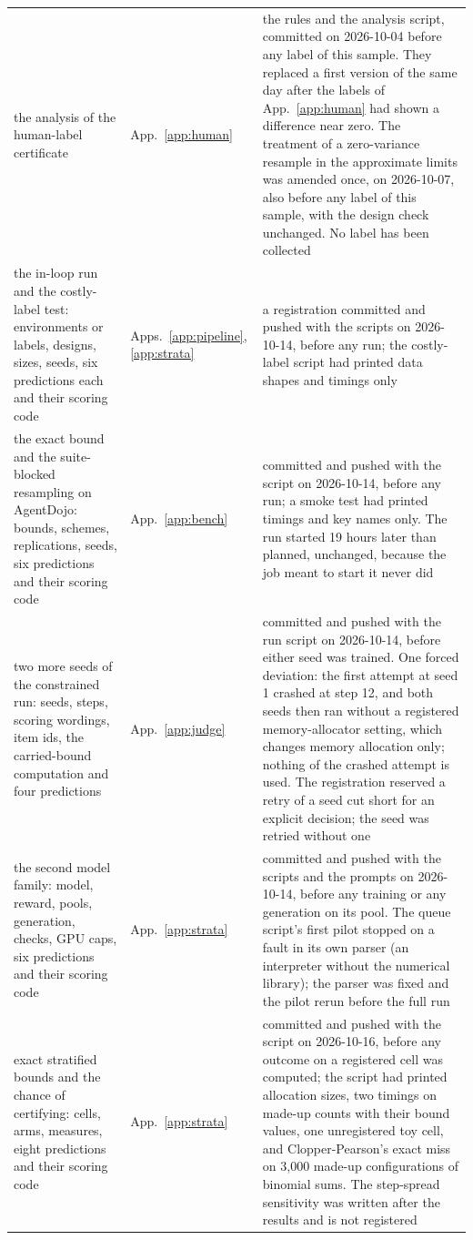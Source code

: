 \begin{tabular}{@{}p{5.6cm} l p{9.2cm}@{}}
the analysis of the human-label certificate & App.~\ref{app:human} & the rules and the analysis script, committed on 2026-10-04 before any label of this sample. They replaced a first version of the same day after the labels of App.~\ref{app:human} had shown a difference near zero. The treatment of a zero-variance resample in the approximate limits was amended once, on 2026-10-07, also before any label of this sample, with the design check unchanged. No label has been collected \\
the in-loop run and the costly-label test: environments or labels, designs, sizes, seeds, six predictions each and their scoring code & Apps.~\ref{app:pipeline}, \ref{app:strata} & a registration committed and pushed with the scripts on 2026-10-14, before any run; the costly-label script had printed data shapes and timings only \\
the exact bound and the suite-blocked resampling on AgentDojo: bounds, schemes, replications, seeds, six predictions and their scoring code & App.~\ref{app:bench} & committed and pushed with the script on 2026-10-14, before any run; a smoke test had printed timings and key names only. The run started 19 hours later than planned, unchanged, because the job meant to start it never did \\
two more seeds of the constrained run: seeds, steps, scoring wordings, item ids, the carried-bound computation and four predictions & App.~\ref{app:judge} & committed and pushed with the run script on 2026-10-14, before either seed was trained. One forced deviation: the first attempt at seed 1 crashed at step 12, and both seeds then ran without a registered memory-allocator setting, which changes memory allocation only; nothing of the crashed attempt is used. The registration reserved a retry of a seed cut short for an explicit decision; the seed was retried without one \\
the second model family: model, reward, pools, generation, checks, GPU caps, six predictions and their scoring code & App.~\ref{app:strata} & committed and pushed with the scripts and the prompts on 2026-10-14, before any training or any generation on its pool. The queue script's first pilot stopped on a fault in its own parser (an interpreter without the numerical library); the parser was fixed and the pilot rerun before the full run \\
exact stratified bounds and the chance of certifying: cells, arms, measures, eight predictions and their scoring code & App.~\ref{app:strata} & committed and pushed with the script on 2026-10-16, before any outcome on a registered cell was computed; the script had printed allocation sizes, two timings on made-up counts with their bound values, one unregistered toy cell, and Clopper-Pearson's exact miss on 3,000 made-up configurations of binomial sums. The step-spread sensitivity was written after the results and is not registered \\

\end{tabular}

